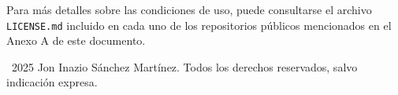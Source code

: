 Para más detalles sobre las condiciones de uso, puede consultarse el archivo \texttt{LICENSE.md} incluido en cada uno de los repositorios públicos mencionados en el Anexo A de este documento.

\noindent\textcopyright~2025 Jon Inazio Sánchez Martínez. Todos los derechos reservados, salvo indicación expresa.